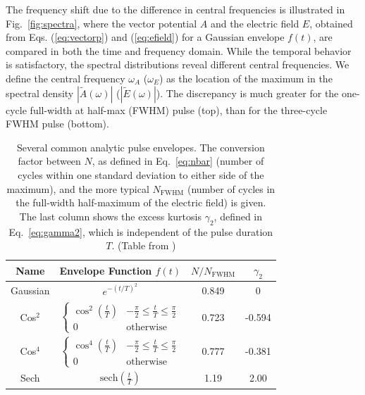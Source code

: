 The frequency shift due to the difference in central frequencies is illustrated in Fig.~\ref{fig:spectra}, where the vector potential $A$ and the electric field $E$, obtained from Eqs. (\ref{eq:vectorp}) and (\ref{eq:efield}) for a Gaussian envelope $f(t)$, are compared in both the time and frequency domain. While the temporal behavior is satisfactory, the spectral distributions reveal different central frequencies. We define the central frequency $\omega_A$ ($\omega_E$) as the location of the maximum in the spectral density $|\tilde{A}(\omega)|$ ($|\tilde{E}(\omega)|$). The discrepancy is much greater for the one-cycle full-width at half-max (FWHM) pulse (top), than for the three-cycle FWHM pulse (bottom).

\begin{table}[t]
\begin{center}
 \begin{tabular}{||c | c | c | c||} 
 \hline
 Name & Envelope Function $f(t)$ & $ N/N_{\text{FWHM}}$ & $\gamma_2$ \\ [0.5ex] 
 \hline\hline
 Gaussian & $e^{-(t/T)^2}$ & 0.849 & 0 \\ 
 \hline
 Cos$^2$ & $\begin{cases} 
      \cos^2\left(\frac{t}{T}\right) & -\frac{\pi}{2} \leq \frac{t}{T} \leq \frac{\pi}{2} \\
      0 & \text{otherwise}
    \end{cases}$ & 0.723 & -0.594 \\
 \hline
  Cos$^4$ &  $\begin{cases} 
        \cos^4\left(\frac{t}{T}\right) & -\frac{\pi}{2} \leq \frac{t}{T} \leq \frac{\pi}{2} \\
        0 & \text{otherwise}
    \end{cases}$ & 0.777 & -0.381 \\
 \hline
 Sech & $\text{sech}(\frac{t}{T})$ & 1.19 & 2.00 \\
 \hline
\end{tabular}
\end{center}
 \caption{Several common analytic pulse envelopes. The conversion factor between $N$, as defined in Eq.~\ref{eq:nbar} (number of cycles within one standard deviation to either side of the maximum), and the more typical $N_{\text{FWHM}}$ (number of cycles in the full-width half-maximum of the electric field) is given. The last column shows the excess kurtosis $\gamma_2$, defined in Eq.~\ref{eq:gamma2}, which is independent of the pulse duration $T$. (Table from \cite{venzke2018_Central})}
 \label{tab:envelopes}
\end{table}

